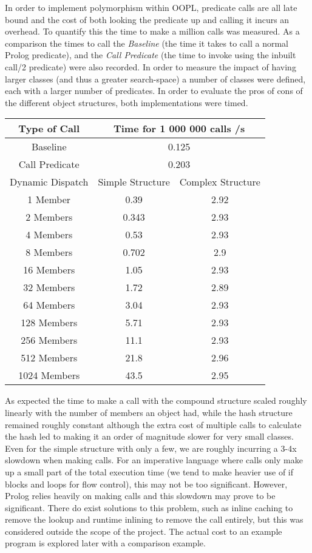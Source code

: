 \documentclass[12pt,a4paper,twoside,openright]{report}
\begin{document}
In order to implement polymorphism within OOPL, predicate calls are all late bound and the cost of both looking the predicate up and calling it incurs an overhead. To quantify this the time to make a million calls was measured. As a comparison the times to call the \emph{Baseline} (the time it takes to call a normal Prolog predicate), and the \emph{Call Predicate} (the time to invoke using the inbuilt call/2 predicate) were also recorded. In order to measure the impact of having larger classes (and thus a greater search-space) a number of classes were defined, each with a larger number of predicates. In order to evaluate the pros of cons of the different object structures, both implementations were timed.

\begin{center}
\begin{tabular}{c|c|c}
Type of Call & \multicolumn{2}{c}{Time for 1 000 000 calls /s} \\
\hline
Baseline&\multicolumn{2}{c}{0.125}\\
Call Predicate&\multicolumn{2}{c}{0.203}\\
\hline
Dynamic Dispatch& Simple Structure & Complex Structure \\
\hline		
1 Member	&	0.39	&	2.92	\\
2 Members	&	0.343	&	2.93	\\
4 Members	&	0.53	&	2.93	\\
8 Members	&	0.702	&	2.9	\\
16 Members	&	1.05	&	2.93	\\
32 Members	&	1.72	&	2.89	\\
64 Members	&	3.04	&	2.93	\\
128 Members	&	5.71	&	2.93	\\
256 Members	&	11.1	&	2.93	\\
512 Members	&	21.8	&	2.96	\\
1024 Members	&	43.5	&	2.95	\\


\end{tabular}
\end{center}

As expected the time to make a call with the compound structure scaled roughly linearly with the number of members an object had, while the hash structure remained roughly constant although the extra cost of multiple calls to calculate the hash led to making it an order of magnitude slower for very small classes. Even for the simple structure with only a few, we are roughly incurring a 3-4x slowdown when making calls. For an imperative language where calls only make up a small part of the total execution time (we tend to make heavier use of if blocks and loops for flow control), this may not be too significant. However, Prolog relies heavily on making calls and this slowdown may prove to be significant. There do exist solutions to this problem, such as inline caching to remove the lookup and runtime inlining to remove the call entirely, but this was considered outside the scope of the project. The actual cost to an example program is explored later with a comparison example.
\end{document}
